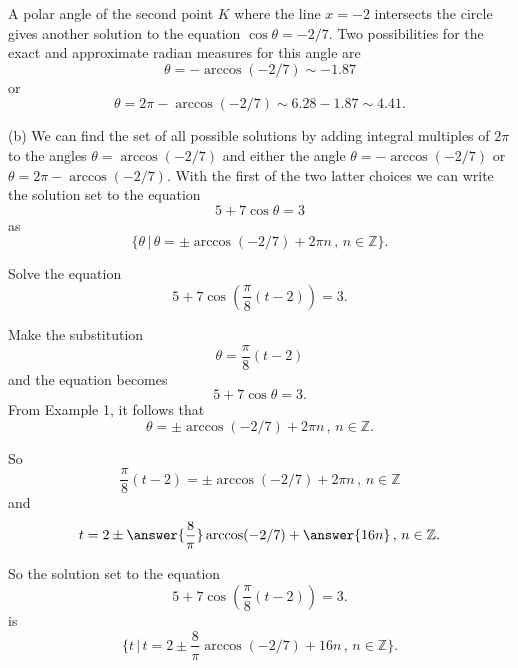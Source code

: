 \documentclass{ximera}
\begin{document}
\begin{example}
\begin{explanation}
A polar angle of the second point $K$ where the line $x=-2$ intersects the circle gives another solution to the equation $\cos\theta = -2/7$. Two possibilities for the exact and approximate radian measures for this angle are
\[
   \theta = -\arccos(-2/7) \sim -1.87 
\]
or 
\[
       \theta = 2\pi - \arccos(-2/7) \sim 6.28 - 1.87 \sim 4.41 .
\]


(b) We can find the set of all possible solutions by adding integral multiples of $2\pi$ to the angles $\theta  =\arccos(-2/7)$ and either the angle $\theta = -\arccos(-2/7)$ or $\theta = 2\pi - \arccos(-2/7)$. With the first of the two latter choices we can write  the solution set to the equation
\[
     5 + 7 \cos\theta  =  3 
\]
as
\[
     \{  \theta \, | \, \theta = \pm \arccos(-2/7) + 2\pi n \, , \, n \in \mathbb{Z}    \}.
\]
 

\end{explanation}
\end{example}

\begin{example} \label{Ex9f93q}
Solve the equation
\[
  5 + 7 \cos \left( \frac{\pi}{8}\left( t-2 \right)  \right) =  3 .
\]

\begin{explanation}
Make the substitution
\[
   \theta = \frac{\pi}{8}\left( t-2 \right)
\]
and the equation becomes
\[ 
     5 + 7 \cos \theta  =  3.
\]
From Example 1, it follows that
\[
  \theta = \pm \arccos(-2/7) + 2\pi n \, , \, n\in \mathbb{Z}.
\]

So
\[
   \frac{\pi}{8}\left( t-2 \right) = \pm \arccos(-2/7) + 2\pi n \, , \, n\in \mathbb{Z}
\]
and
\[
  t = 2 \pm \answer{\frac{8}{\pi}} \arccos(-2/7) + \answer{16n} \, , \, n\in \mathbb{Z}.
\]

So the solution set to the equation
\[
  5 + 7 \cos \left( \frac{\pi}{8}\left( t-2 \right)  \right) =  3 .
\]
is
\[
 \{ t \, | \,   t = 2 \pm \frac{8}{\pi} \arccos(-2/7) + 16n \, , \, n\in \mathbb{Z}     \}.
\]
\end{explanation}
\end{example}
\end{document}
